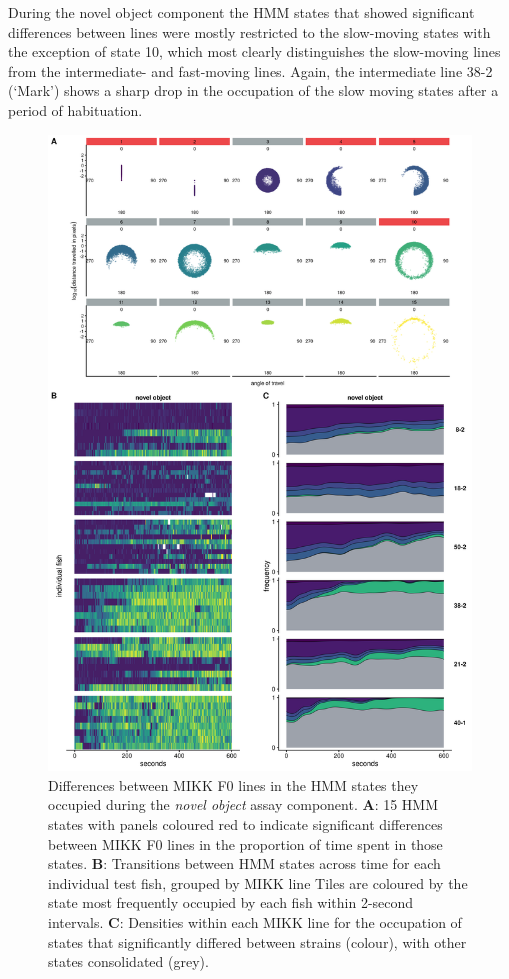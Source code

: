 \documentclass[
]{book}
\begin{document}
During the novel object component the HMM states that showed significant differences between lines were mostly restricted to the slow-moving states with the exception of state 10, which most clearly distinguishes the slow-moving lines from the intermediate- and fast-moving lines. Again, the intermediate line \textcolor{38-2 (‘Mark’)_00C08B}{38-2 (‘Mark’)} shows a sharp drop in the occupation of the slow moving states after a period of habituation.



\begin{figure}
\includegraphics[width=1\linewidth]{figs/mikk_behaviour/select_0.08_15_dge_no} \caption{Differences between MIKK F0 lines in the HMM states they occupied during the \emph{novel object} assay component. \textbf{A}: 15 HMM states with panels coloured red to indicate significant differences between MIKK F0 lines in the proportion of time spent in those states. \textbf{B}: Transitions between HMM states across time for each individual test fish, grouped by MIKK line Tiles are coloured by the state most frequently occupied by each fish within 2-second intervals. \textbf{C}: Densities within each MIKK line for the occupation of states that significantly differed between strains (colour), with other states consolidated (grey).}\label{fig:F2-time-dge-no}
\end{figure}
\end{document}
